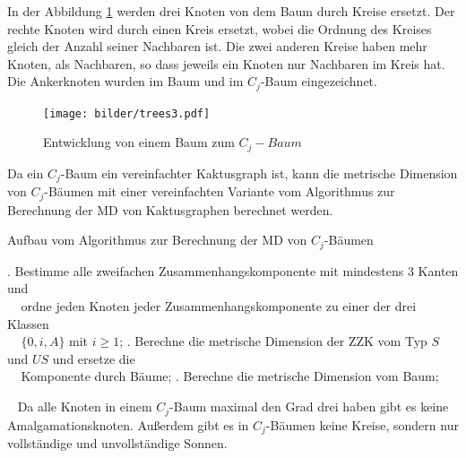 \begin{bsp}
In der Abbildung \ref{c_jbaum} werden drei Knoten von dem Baum durch Kreise ersetzt. Der rechte Knoten wird durch einen Kreis ersetzt, wobei die Ordnung des Kreises gleich der Anzahl seiner Nachbaren ist. Die zwei anderen Kreise haben mehr Knoten, als Nachbaren, so dass jeweils ein Knoten nur Nachbaren im Kreis hat. Die Ankerknoten wurden im Baum und im $C_j$-Baum eingezeichnet.\\
\vspace{-4mm}
\begin{figure}[h!]
		\centering 		 
   \texttt{[image: bilder/trees3.pdf]}
	\caption{Entwicklung von einem Baum zum $C_{j}-Baum$}
	\label{c_jbaum}
  	 \end{figure}
\vspace{-4mm}
\end{bsp}
\begin{bem}
Da ein $C_j$-Baum ein vereinfachter Kaktusgraph ist, kann die metrische Dimension von $C_j$-Bäumen  mit einer vereinfachten Variante vom Algorithmus zur Berechnung der MD von Kaktusgraphen berechnet werden.
\begin{algorithm}
\caption{Aufbau vom Algorithmus zur Berechnung der MD von $C_j$-Bäumen}
\begin{algorithmic}
. Bestimme alle zweifachen Zusammenhangskomponente mit mindestens 3 Kanten und\\$\;\;\;\;$ordne jeden Knoten jeder Zusammenhangskomponente zu einer der drei Klassen\\$\;\;\;\;\{0,i,A\}$ mit $i \geq 1$;
. Berechne die metrische Dimension der ZZK vom Typ $S$ und $US$ und ersetze die\\$\;\;\;\;$Komponente durch Bäume;
. Berechne die metrische Dimension vom Baum;
\end{algorithmic}
\end{algorithm}
~\linebreak
Da alle Knoten in einem $C_j$-Baum maximal den Grad drei haben gibt es keine Amalgamationsknoten. Außerdem gibt es in $C_j$-Bäumen keine Kreise, sondern nur vollständige und unvollständige Sonnen.
\end{bem}
